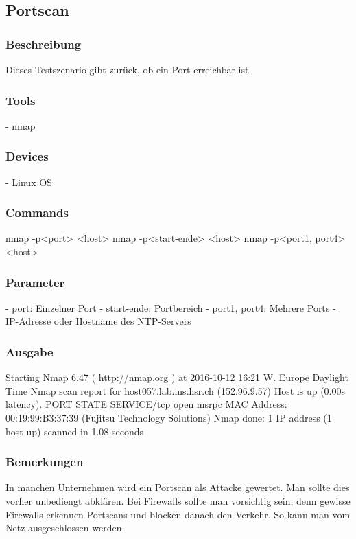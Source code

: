 \documentclass[a4,12pt]{scrartcl}
\begin{document}
\subsection{Portscan}
\subsubsection{Beschreibung}
Dieses Testszenario gibt zurück, ob ein Port erreichbar ist.
\subsubsection{Tools}
- nmap
\subsubsection{Devices}
- Linux OS
\subsubsection{Commands}
nmap -p<port> <host>
nmap -p<start-ende> <host>
nmap -p<port1, port4> <host>
\subsubsection{Parameter}
- port: Einzelner Port
- start-ende: Portbereich
- port1, port4: Mehrere Ports
- IP-Adresse oder Hostname des NTP-Servers
\subsubsection{Ausgabe}
Starting Nmap 6.47 ( http://nmap.org ) at 2016-10-12 16:21 W. Europe Daylight Time\newline
Nmap scan report for host057.lab.ins.hsr.ch (152.96.9.57)\newline
Host is up (0.00s latency).\newline
PORT    STATE SERVICE/tcp open  msrpc\newline
MAC Address: 00:19:99:B3:37:39 (Fujitsu Technology Solutions)\newline
Nmap done: 1 IP address (1 host up) scanned in 1.08 seconds\newline
\subsubsection{Bemerkungen}
In manchen Unternehmen wird ein Portscan als Attacke gewertet. Man sollte dies vorher unbediengt abklären.
Bei Firewalls sollte man vorsichtig sein, denn gewisse Firewalls erkennen Portscans und blocken danach den Verkehr. So kann man vom Netz ausgeschlossen werden.
\end{document}
